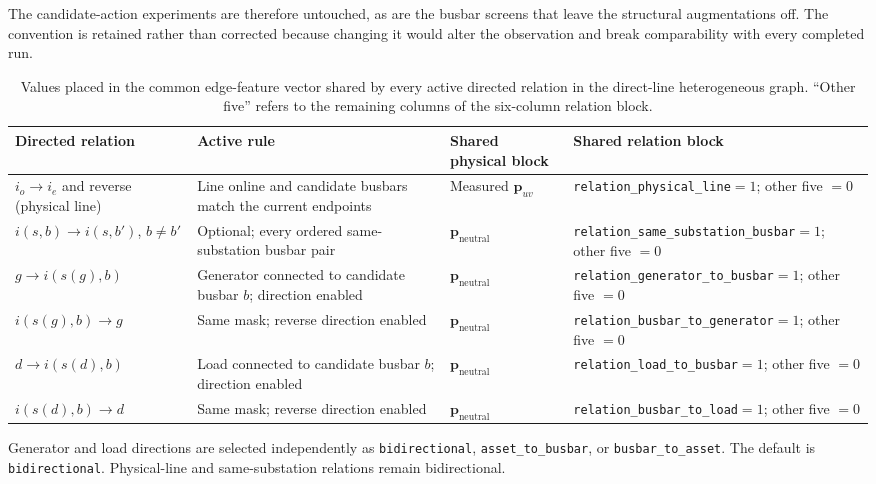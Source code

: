{\noindent The candidate-action experiments are therefore untouched, as are the
busbar screens that leave the structural augmentations off. The convention is
retained rather than corrected because changing it would alter the observation
and break comparability with every completed run.
}

\begin{table}[H]
  \centering
  \scriptsize
  \caption{Values placed in the common edge-feature vector shared by every
  active directed relation in the direct-line heterogeneous graph. ``Other
  five'' refers to the remaining columns of the six-column relation block.}
  \label{tab:heterogeneous-edge-features}
  \setlength{\tabcolsep}{3pt}
  \begin{tabular}{L{0.20\textwidth}L{0.25\textwidth}L{0.17\textwidth}L{0.29\textwidth}}
    \toprule
    Directed relation & Active rule & Shared physical block & Shared relation block \\
    \midrule
    $i_o\rightarrow i_e$ and reverse (physical line) & Line online and candidate busbars match the current endpoints & Measured $\mathbf{p}_{uv}$ & \texttt{relation\_physical\_line}$=1$; other five $=0$ \\
    $i(s,b)\rightarrow i(s,b')$, $b\neq b'$ & Optional; every ordered same-substation busbar pair & $\mathbf{p}_{\mathrm{neutral}}$ & \texttt{relation\_same\_substation\_busbar}$=1$; other five $=0$ \\
    $g\rightarrow i(s(g),b)$ & Generator connected to candidate busbar $b$; direction enabled & $\mathbf{p}_{\mathrm{neutral}}$ & \texttt{relation\_generator\_to\_busbar}$=1$; other five $=0$ \\
    $i(s(g),b)\rightarrow g$ & Same mask; reverse direction enabled & $\mathbf{p}_{\mathrm{neutral}}$ & \texttt{relation\_busbar\_to\_generator}$=1$; other five $=0$ \\
    $d\rightarrow i(s(d),b)$ & Load connected to candidate busbar $b$; direction enabled & $\mathbf{p}_{\mathrm{neutral}}$ & \texttt{relation\_load\_to\_busbar}$=1$; other five $=0$ \\
    $i(s(d),b)\rightarrow d$ & Same mask; reverse direction enabled & $\mathbf{p}_{\mathrm{neutral}}$ & \texttt{relation\_busbar\_to\_load}$=1$; other five $=0$ \\
    \bottomrule
  \end{tabular}
\end{table}

\noindent Generator and load directions are selected independently as \texttt{bidirectional},
\texttt{asset\_to\_busbar}, or \texttt{busbar\_to\_asset}. The default is
\texttt{bidirectional}. Physical-line and
same-substation relations remain bidirectional.


